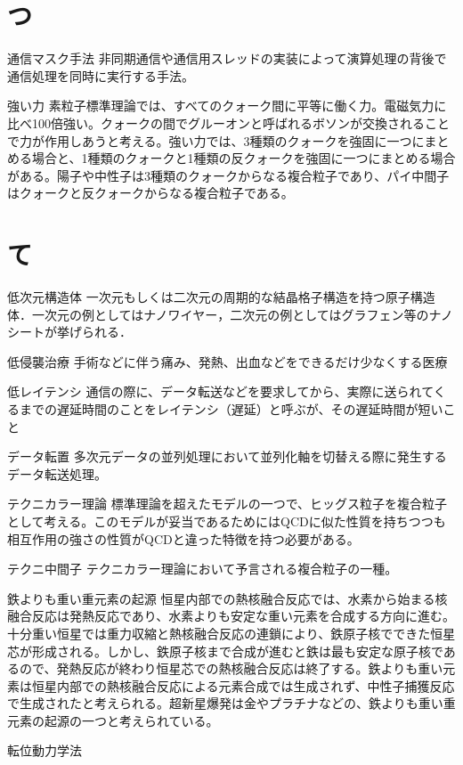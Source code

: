 \begin{用語集}
\section{つ}
\item{通信マスク手法}{}
{非同期通信や通信用スレッドの実装によって演算処理の背後で通信処理を同時に実行する手法。}
\item{強い力}{}
{素粒子標準理論では、すべてのクォーク間に平等に働く力。電磁気力に比べ100倍強い。クォークの間でグルーオンと呼ばれるボソンが交換されることで力が作用しあうと考える。強い力では、3種類のクォークを強固に一つにまとめる場合と、1種類のクォークと1種類の反クォークを強固に一つにまとめる場合がある。陽子や中性子は3種類のクォークからなる複合粒子であり、パイ中間子はクォークと反クォークからなる複合粒子である。}
\section{て}
\item{低次元構造体}{}
{一次元もしくは二次元の周期的な結晶格子構造を持つ原子構造体．一次元の例としてはナノワイヤー，二次元の例としてはグラフェン等のナノシートが挙げられる．}
\item{低侵襲治療}{}
{手術などに伴う痛み、発熱、出血などをできるだけ少なくする医療}
\item{低レイテンシ}{}
{通信の際に、データ転送などを要求してから、実際に送られてくるまでの遅延時間のことをレイテンシ（遅延）と呼ぶが、その遅延時間が短いこと}
\item{データ転置}{}
{多次元データの並列処理において並列化軸を切替える際に発生するデータ転送処理。}
\item{テクニカラー理論}{}
{標準理論を超えたモデルの一つで、ヒッグス粒子を複合粒子として考える。このモデルが妥当であるためにはQCDに似た性質を持ちつつも相互作用の強さの性質がQCDと違った特徴を持つ必要がある。}
\item{テクニ中間子}{}
{テクニカラー理論において予言される複合粒子の一種。}
\item{鉄よりも重い重元素の起源}{}
{恒星内部での熱核融合反応では、水素から始まる核融合反応は発熱反応であり、水素よりも安定な重い元素を合成する方向に進む。十分重い恒星では重力収縮と熱核融合反応の連鎖により、鉄原子核でできた恒星芯が形成される。しかし、鉄原子核まで合成が進むと鉄は最も安定な原子核であるので、発熱反応が終わり恒星芯での熱核融合反応は終了する。鉄よりも重い元素は恒星内部での熱核融合反応による元素合成では生成されず、中性子捕獲反応で生成されたと考えられる。超新星爆発は金やプラチナなどの、鉄よりも重い重元素の起源の一つと考えられている。}
\item{転位動力学法}{}

\end{用語集}
